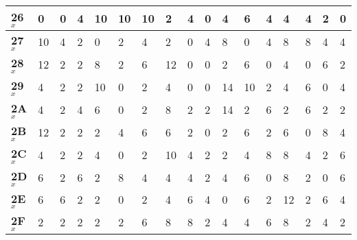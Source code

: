 \begin{longtable}[c]{|l|l|l|l|l|l|l|l|l|l|l|l|l|l|l|l|l|}
\textbf{26}$_x$ & 0          & 0          & 4          & 10         & 10         & 10         & 2          & 4          & 0          & 4          & 6          & 4          & 4          & 4          & 2          & 0          \\ \hline
\textbf{27}$_x$ & 10         & 4          & 2          & 0          & 2          & 4          & 2          & 0          & 4          & 8          & 0          & 4          & 8          & 8          & 4          & 4          \\ \hline
\textbf{28}$_x$ & 12         & 2          & 2          & 8          & 2          & 6          & 12         & 0          & 0          & 2          & 6          & 0          & 4          & 0          & 6          & 2          \\ \hline
\textbf{29}$_x$ & 4          & 2          & 2          & 10         & 0          & 2          & 4          & 0          & 0          & 14         & 10         & 2          & 4          & 6          & 0          & 4          \\ \hline
\textbf{2A}$_x$ & 4          & 2          & 4          & 6          & 0          & 2          & 8          & 2          & 2          & 14         & 2          & 6          & 2          & 6          & 2          & 2          \\ \hline
\textbf{2B}$_x$ & 12         & 2          & 2          & 2          & 4          & 6          & 6          & 2          & 0          & 2          & 6          & 2          & 6          & 0          & 8          & 4          \\ \hline
\textbf{2C}$_x$ & 4          & 2          & 2          & 4          & 0          & 2          & 10         & 4          & 2          & 2          & 4          & 8          & 8          & 4          & 2          & 6          \\ \hline
\textbf{2D}$_x$ & 6          & 2          & 6          & 2          & 8          & 4          & 4          & 4          & 2          & 4          & 6          & 0          & 8          & 2          & 0          & 6          \\ \hline
\textbf{2E}$_x$ & 6          & 6          & 2          & 2          & 0          & 2          & 4          & 6          & 4          & 0          & 6          & 2          & 12         & 2          & 6          & 4          \\ \hline
\textbf{2F}$_x$ & 2          & 2          & 2          & 2          & 2          & 6          & 8          & 8          & 2          & 4          & 4          & 6          & 8          & 2          & 4          & 2          \\ \hline

\end{longtable}
